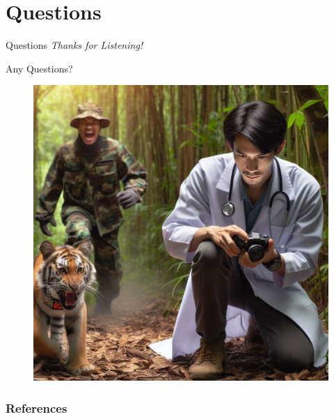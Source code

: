 \documentclass{beamer}
\begin{document}
\section{Questions}

\begin{frame}{Questions}
  \centering \Large
  \emph{Thanks for Listening!}

  Any Questions?

  \begin{figure}[htbp]
    \centering
    \includegraphics[height=.6\textheight]{images/Biologging_scenario.jpg}
    \label{fig:Biologging_scenario_return}
  \end{figure}
\end{frame}

\begin{frame}[allowframebreaks]
  \frametitle{References}
  \printbibliography
\end{frame}
\end{document}

